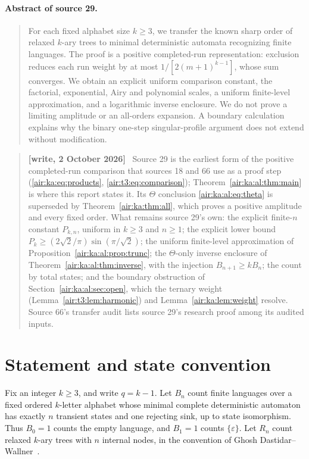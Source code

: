 \documentclass[11pt,letterpaper]{article}
\numberwithin{equation}{section}
\theoremstyle{remark}
\newenvironment{writenote}{\par\smallskip\begin{quote}\small\textbf{[write, 2 October 2026]}\ }{\end{quote}\smallskip}
\begin{document}
\paragraph{Abstract of source 29.}
\begin{quote}\small
For each fixed alphabet size $k\ge3$, we transfer the known sharp order of
relaxed $k$-ary trees to minimal deterministic automata recognizing finite
languages. The proof is a positive completed-run representation: exclusion
reduces each run weight by at most $1/[2(m+1)^{k-1}]$, whose sum converges.
We obtain an explicit uniform comparison constant, the factorial,
exponential, Airy and polynomial scales, a uniform finite-level approximation,
and a logarithmic inverse enclosure. We do not prove a limiting amplitude
or an all-orders expansion. A boundary calculation explains why the binary
one-step singular-profile argument does not extend without modification.
\end{quote}


\begin{writenote}
Source 29 is the earliest form of the positive completed-run comparison that sources 18 and 66 use as a proof step (\eqref{air:ka:eq:products}, \eqref{air:t3:eq:comparison}); Theorem~\ref{air:ka:al:thm:main} is where this report states it. Its $\Theta$ conclusion \eqref{air:ka:al:eq:theta} is superseded by Theorem~\ref{air:ka:thm:all}, which proves a positive amplitude and every fixed order. What remains source 29's own: the explicit finite-$n$ constant $P_{k,n}$, uniform in $k\ge3$ and $n\ge1$; the explicit lower bound $P_k\ge(2\sqrt2/\pi)\sin(\pi/\sqrt2)$; the uniform finite-level approximation of Proposition~\ref{air:ka:al:prop:trunc}; the $\Theta$-only inverse enclosure of Theorem~\ref{air:ka:al:thm:inverse}, with the injection $B_{n+1}\ge kB_n$; the count by total states; and the boundary obstruction of Section~\ref{air:ka:al:sec:open}, which the ternary weight (Lemma~\ref{air:t3:lem:harmonic}) and Lemma~\ref{air:ka:lem:weight} resolve. Source 66's transfer audit lists source 29's research proof among its audited inputs.
\end{writenote}

\section{Statement and state convention}\label{air:ka:al:sec:statement}
Fix an integer $k\ge3$, and write $q=k-1$. Let $B_n$ count finite languages
over a fixed ordered $k$-letter alphabet whose minimal complete deterministic
automaton has exactly $n$ transient states and one rejecting sink, up to
state isomorphism. Thus $B_0=1$ counts the empty language, and $B_1=1$ counts
$\{\varepsilon\}$. Let $R_n$ count relaxed $k$-ary trees with $n$ internal
nodes, in the convention of Ghosh Dastidar--Wallner~\cite{gdw}.
\end{document}

